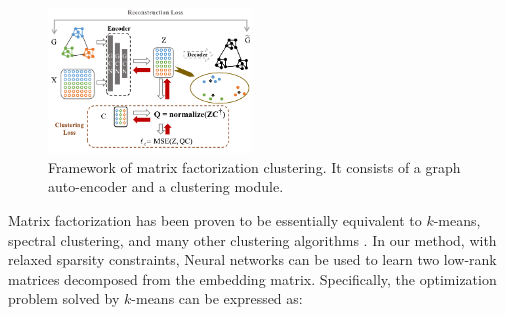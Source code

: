 \documentclass[letterpaper]{article} %
\begin{document}
\begin{figure}[] %
\centering %
\includegraphics[width=0.48\textwidth]{pic/MFC.pdf} %
\caption{Framework of matrix factorization clustering. It consists of a graph auto-encoder and a clustering module.} %
\end{figure}

Matrix factorization has been proven to be essentially equivalent to $k$-means, spectral clustering, and many other clustering algorithms \cite{math11122674}. In our method, with relaxed sparsity constraints, Neural networks can be used to learn two low-rank matrices decomposed from the embedding matrix. Specifically, the optimization problem solved by $k$-means can be expressed as:%
\end{document}
